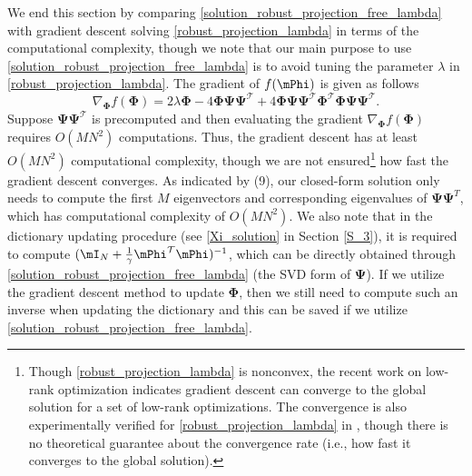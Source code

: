 \documentclass[final,5p,times,twocolumn]{elsarticle}
\begin{document}
{
We end this section by comparing \eqref{solution_robust_projection_free_lambda} with gradient descent solving \eqref{robust_projection_lambda} in terms of the computational complexity, though we note that our main purpose to use \eqref{solution_robust_projection_free_lambda} is to avoid tuning the parameter $\lambda$ in \eqref{robust_projection_lambda}.
The gradient of $f(\mPhi)$ is given as follows
\[
\nabla_{\bm \Phi} f(\bm \Phi)=2\lambda\bm\Phi-4\bm \Phi\bm\Psi\bm\Psi^\mathcal T+4\bm \Phi\bm\Psi\bm\Psi^\mathcal T\bm \Phi^\mathcal T \bm \Phi\bm\Psi\bm\Psi^\mathcal T.
\]
Suppose $\bm \Psi \bm\Psi^\mathcal T$ is precomputed and then evaluating the gradient $\nabla_{\bm \Phi} f(\bm \Phi)$ requires $O(MN^2)$ computations. Thus, the gradient descent has at least $O(MN^2)$ computational complexity, though we are not ensured\footnote{Though \eqref{robust_projection_lambda} is nonconvex, the recent work on low-rank optimization \cite{Zhu2017} indicates gradient descent can converge to the global solution for a set of low-rank optimizations. The convergence is also experimentally verified for \eqref{robust_projection_lambda} in \cite{TZ16}, though there is no theoretical guarantee about the convergence rate (i.e., how fast it converges to the global solution).
} how fast the gradient descent converges. As indicated by (9), our closed-form solution only needs to compute the first $M$ eigenvectors and corresponding eigenvalues of $\bm \Psi\bm \Psi^T$, which has computational complexity of $O(MN^2)$. We also note that in the dictionary updating procedure (see \eqref{Xi_solution} in Section \ref{S_3}), it is required to compute $(\mI_N +\frac{1}{\gamma}\mPhi^\mathcal T\mPhi)^{-1}$, which can be directly obtained through \eqref{solution_robust_projection_free_lambda} (the SVD form of $\bm \Psi$). If we utilize the gradient descent method to update $\bm \Phi$, then we still need to compute such an inverse when updating the dictionary and this can be saved if we utilize \eqref{solution_robust_projection_free_lambda}.
}


\end{document}
